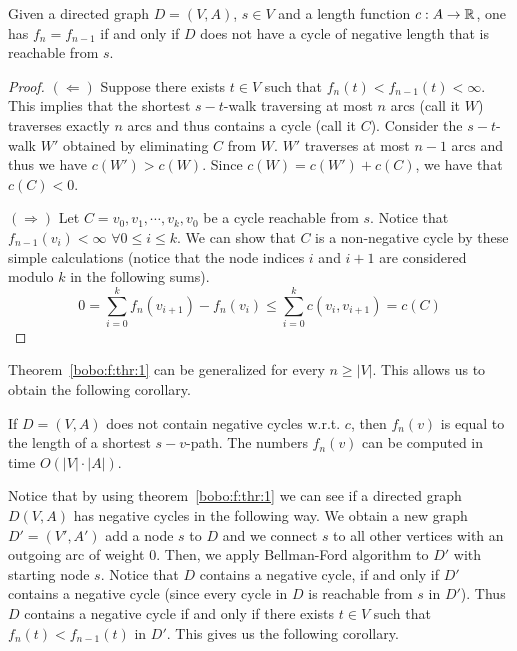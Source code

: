 \begin{theorem}
   \label{bobo:f:thr:1}
   Given a directed graph $D=(V,A)$, $s \in V$ and a length 
   function $c:A \to \mathbb{R}$, one has $f_n = f_{n-1}$ if and only 
   if $D$ does not have a cycle 
   of negative length that is reachable from $s$.
\end{theorem}

\begin{proof}
   $(\Leftarrow)$ Suppose there exists $t \in V$ such that 
   $f_n(t) < f_{n-1}(t) < \infty$. This implies that the shortest 
   $s-t$-walk traversing at most $n$ arcs (call it $W$) traverses 
   exactly $n$ arcs and thus contains a cycle (call it $C$). Consider 
   the $s-t$-walk $W'$ obtained by eliminating $C$ from $W$. 
   $W'$ traverses at most $n-1$ arcs and thus we have $c(W') > c(W)$.
   Since $c(W) = c(W') + c(C)$, we have that $c(C) < 0$.
   
   $(\Rightarrow)$ Let $C = v_0,v_1,\cdots,v_k,v_0$ be a cycle 
   reachable from $s$. Notice that 
   $f_{n-1}(v_i)<\infty$ $\forall 0 \leq i \leq k$. 
   We can show that $C$ is a non-negative cycle by these simple 
   calculations (notice that the node indices $i$ and $i+1$ are 
   considered modulo $k$ in the following sums).
   \begin{displaymath}
      0 = \sum_{i = 0}^k f_n(v_{i+1}) - f_n(v_i) \leq
      \sum_{i = 0}^k c(v_i,v_{i+1}) = c(C)
   \end{displaymath}
\end{proof}

Theorem~\ref{bobo:f:thr:1} can be generalized for every $n \geq |V|$.
This allows us to obtain the following corollary.

\begin{corollary}
  \label{co:7}
  If $D = (V,A) $ does not contain negative cycles w.r.t. $c$, then
  $f_n(v)$ is equal to the length of a shortest $s-v$-path. The
  numbers $f_n(v)$ can be computed in time $O( |V| \cdot |A| )$. 
\end{corollary}

Notice that by using theorem~\ref{bobo:f:thr:1} 
we can see if a directed graph $D(V,A)$ has negative cycles in the 
following way. We obtain a new graph $D'=(V',A')$ add a node $s$ to 
$D$ and we connect $s$ to all other vertices with an outgoing arc 
of weight $0$. Then, we apply Bellman-Ford algorithm to $D'$ with 
starting node $s$. Notice that $D$ contains a negative cycle, if 
and only if $D'$ contains a negative cycle (since every cycle in $D$ 
is reachable from $s$ in $D'$). Thus $D$ contains a 
negative cycle if and only if there exists $t \in V$ such that 
$f_n(t) < f_{n-1}(t)$ in $D'$.
This gives us the following corollary.

